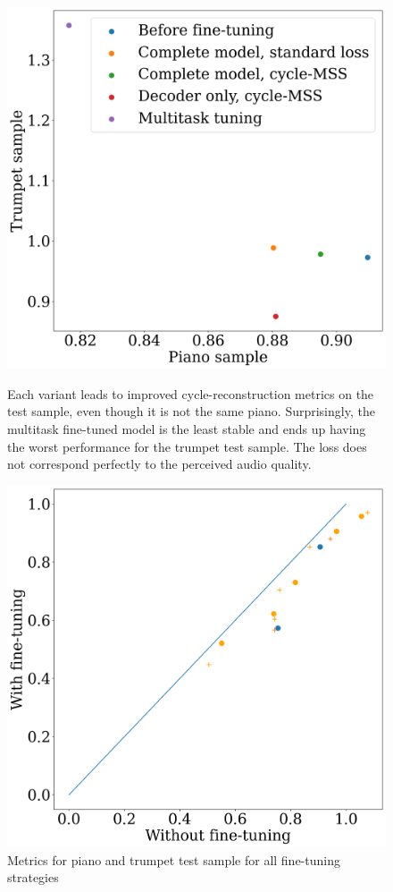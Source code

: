\begin{figure}
    \begin{minipage}[b]{0.45\textwidth}
        \centering
        \includegraphics[width=\textwidth]{figures/fine-tuning/overview.png}
        \caption{Metrics for piano and trumpet test sample for all fine-tuning strategies}
        \label{fig:tuning-overview}
        \small{Each variant leads to improved cycle-reconstruction metrics on the test sample, even though it is not the same piano. Surprisingly, the multitask fine-tuned model is the least stable and ends up having the worst performance for the trumpet test sample. The loss does not correspond perfectly to the perceived audio quality.}
    \end{minipage}
    \hfill
    \begin{minipage}[b]{0.45\textwidth}
        \centering
        \includegraphics[width=\textwidth]{figures/fine-tuning/final.png}

\end{minipage}
\end{figure}
